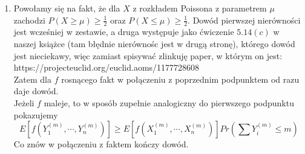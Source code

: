 \documentclass{article}
\begin{document}
\begin{enumerate}
\begin{enumerate}
			\item Powołamy się na fakt, że dla $X$ z rozkładem Poissona z parametrem $\mu$ zachodzi $P(X \geq \mu) \geq \frac{1}{2}$ oraz $P(X \leq \mu) \geq \frac{1}{2}$. Dowód pierwszej nierówności jest wcześniej w zestawie, a druga występuje jako ćwiczenie $5.14(c)$ w naszej książce (tam błędnie nierównośc jest w drugą stronę), którego dowód jest nieciekawy, więc zamiast spisywać zlinkuję paper, w którym on jest: https://projecteuclid.org/euclid.aoms/1177728608 \\
			Zatem dla $f$ rosnącego fakt w połączeniu z poprzednim podpunktem od razu daje dowód. \\
			Jeżeli $f$ maleje, to w sposób zupełnie analogiczny do pierwszego podpunktu pokazujemy
			\[
			E[f(Y_1^{(m)},\cdots,Y_n^{(m)})] \geq E[f(X_1^{(m)},\cdots, X_n^{(m)})]Pr\left(\sum Y_i^{(m)} \leq m\right)
			\]
			Co znów w połączeniu z faktem kończy dowód.
		\end{enumerate}
	\end{enumerate}
\end{document}
